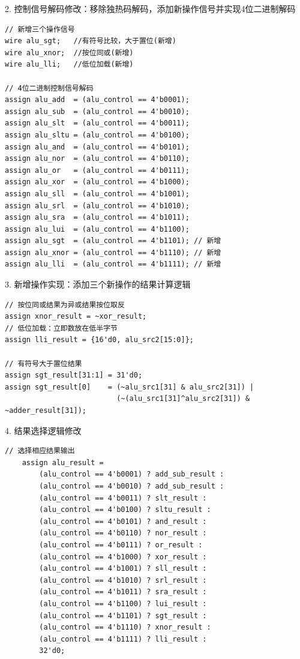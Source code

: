 \documentclass[12pt,a4paper]{article}
\begin{document}
2. 控制信号解码修改：移除独热码解码，添加新操作信号并实现4位二进制解码
\begin{lstlisting}
// 新增三个操作信号
wire alu_sgt;   //有符号比较，大于置位(新增)
wire alu_xnor;  //按位同或(新增)
wire alu_lli;   //低位加载(新增)

// 4位二进制控制信号解码
assign alu_add  = (alu_control == 4'b0001);
assign alu_sub  = (alu_control == 4'b0010);
assign alu_slt  = (alu_control == 4'b0011);
assign alu_sltu = (alu_control == 4'b0100);
assign alu_and  = (alu_control == 4'b0101);
assign alu_nor  = (alu_control == 4'b0110);
assign alu_or   = (alu_control == 4'b0111);
assign alu_xor  = (alu_control == 4'b1000);
assign alu_sll  = (alu_control == 4'b1001);
assign alu_srl  = (alu_control == 4'b1010);
assign alu_sra  = (alu_control == 4'b1011);
assign alu_lui  = (alu_control == 4'b1100);
assign alu_sgt  = (alu_control == 4'b1101); // 新增
assign alu_xnor = (alu_control == 4'b1110); // 新增
assign alu_lli  = (alu_control == 4'b1111); // 新增
\end{lstlisting}

3. 新增操作实现：添加三个新操作的结果计算逻辑
\begin{lstlisting}
// 按位同或结果为异或结果按位取反
assign xnor_result = ~xor_result;             
// 低位加载：立即数放在低半字节
assign lli_result = {16'd0, alu_src2[15:0]};  

// 有符号大于置位结果
assign sgt_result[31:1] = 31'd0;
assign sgt_result[0]    = (~alu_src1[31] & alu_src2[31]) | 
                          (~(alu_src1[31]^alu_src2[31]) & ~adder_result[31]);
\end{lstlisting}

4. 结果选择逻辑修改
\begin{lstlisting}
// 选择相应结果输出
    assign alu_result = 
        (alu_control == 4'b0001) ? add_sub_result :
        (alu_control == 4'b0010) ? add_sub_result :
        (alu_control == 4'b0011) ? slt_result :
        (alu_control == 4'b0100) ? sltu_result :
        (alu_control == 4'b0101) ? and_result :
        (alu_control == 4'b0110) ? nor_result :
        (alu_control == 4'b0111) ? or_result :
        (alu_control == 4'b1000) ? xor_result :
        (alu_control == 4'b1001) ? sll_result :
        (alu_control == 4'b1010) ? srl_result :
        (alu_control == 4'b1011) ? sra_result :
        (alu_control == 4'b1100) ? lui_result :
        (alu_control == 4'b1101) ? sgt_result :
        (alu_control == 4'b1110) ? xnor_result :
        (alu_control == 4'b1111) ? lli_result :
        32'd0;
\end{lstlisting}
\end{document}
